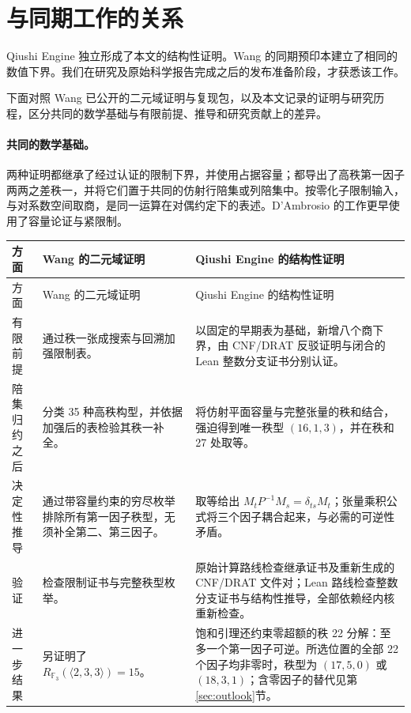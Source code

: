 \section{与同期工作的关系}\label{app:comparison}

Qiushi Engine 独立形成了本文的结构性证明。Wang 的同期预印本建立了相同的数值下界\cite{wang2026twentyone}。我们在研究及原始科学报告完成之后的发布准备阶段，才获悉该工作。

下面对照 Wang 已公开的二元域证明与复现包，以及本文记录的证明与研究历程，区分共同的数学基础与有限前提、推导和研究贡献上的差异。

\paragraph{共同的数学基础。}
两种证明都继承了经过认证的限制下界，并使用占据容量；都导出了高秩第一因子两两之差秩一，并将它们置于共同的仿射行陪集或列陪集中。按零化子限制输入，与对系数空间取商，是同一运算在对偶约定下的表述。D'Ambrosio 的工作更早使用了容量论证与紧限制\cite{dambrosio2026}。

\begin{longtable}{@{}L{2.1cm}L{5.7cm}L{6.4cm}@{}}
\toprule
方面&Wang 的二元域证明&Qiushi Engine 的结构性证明\\
\midrule
\endfirsthead
\toprule 方面&Wang 的二元域证明&Qiushi Engine 的结构性证明\\\midrule
\endhead
\bottomrule\endfoot
有限前提
&通过秩一张成搜索与回溯加强限制表。
&以固定的早期表为基础，新增八个商下界，由 CNF/DRAT 反驳证明与闭合的 Lean 整数分支证书分别认证。\\
陪集归约之后
&分类 35 种高秩构型，并依据加强后的表检验其秩一补全。
&将仿射平面容量与完整张量的秩和结合，强迫得到唯一秩型 $(16,1,3)$，并在秩和 27 处取等。\\
决定性推导
&通过带容量约束的穷尽枚举排除所有第一因子秩型，无须补全第二、第三因子。
&取等给出 $M_tP^{-1}M_s=\delta_{ts}M_t$；张量乘积公式将三个因子耦合起来，与必需的可逆性矛盾。\\
验证
&检查限制证书与完整秩型枚举。
&原始计算路线检查继承证书及重新生成的 CNF/DRAT 文件对；Lean 路线检查整数分支证书与结构性推导，全部依赖经内核重新检查。\\
进一步结果
&另证明了 $R_{\mathbb F_3}(\langle2,3,3\rangle)=15$。
&饱和引理还约束零超额的秩 22 分解：至多一个第一因子可逆。所选位置的全部 22 个因子均非零时，秩型为 $(17,5,0)$ 或 $(18,3,1)$；含零因子的替代见第\ref{sec:outlook}节。\\
\end{longtable}

